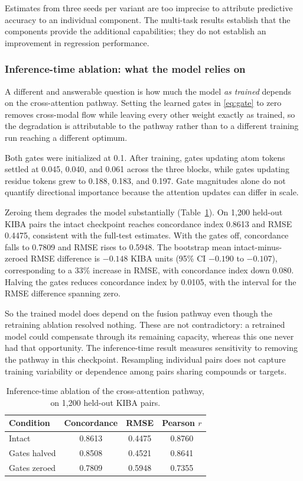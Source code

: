 \documentclass{ieeeaccess}
\begin{document}
Estimates from three seeds per variant are too imprecise to attribute
predictive accuracy to an individual component. The multi-task
results establish that the components provide the additional capabilities;
they do not establish an improvement in regression performance.

\subsubsection{Inference-time ablation: what the model relies on}
A different and answerable question is how much the model \emph{as trained}
depends on the cross-attention pathway. Setting the learned gates in
\eqref{eq:gate} to zero removes cross-modal flow while leaving every other weight
exactly as trained, so the degradation is attributable to the pathway rather
than to a different training run reaching a different optimum.

Both gates were initialized at 0.1. After training, gates updating atom tokens
settled at 0.045, 0.040, and 0.061 across the three blocks, while gates updating
residue tokens grew to 0.188, 0.183, and 0.197. Gate magnitudes alone do not
quantify directional importance because the attention updates can differ in scale.

Zeroing them degrades the model substantially (Table~\ref{tab:ablation_inf}). On
1{,}200 held-out KIBA pairs the intact checkpoint reaches concordance index
0.8613 and RMSE 0.4475, consistent with the full-test estimates. With the gates
off, concordance falls to 0.7809 and RMSE rises to 0.5948. The bootstrap mean intact-minus-zeroed RMSE
difference is $-0.148$ KIBA units (95\% CI $-0.190$ to $-0.107$),
corresponding to a 33\% increase in RMSE, with
concordance index down 0.080. Halving the gates reduces concordance index by
0.0105, with the interval for the RMSE difference spanning zero.

So the trained model does depend on the fusion pathway even though the
retraining ablation resolved nothing. These are not contradictory: a retrained
model could compensate through its remaining capacity, whereas this one never
had that opportunity. The inference-time result measures sensitivity to removing the pathway in this
checkpoint. Resampling individual pairs does not capture training variability
or dependence among pairs sharing compounds or targets.

\begin{table}[!t]
\caption{Inference-time ablation of the cross-attention pathway, on 1{,}200
held-out KIBA pairs.}
\label{tab:ablation_inf}
\centering
\begin{tabular}{lccc}
\toprule
Condition & Concordance & RMSE & Pearson $r$ \\
\midrule
Intact                  & 0.8613 & 0.4475 & 0.8760 \\
Gates halved            & 0.8508 & 0.4521 & 0.8641 \\
Gates zeroed            & 0.7809 & 0.5948 & 0.7355 \\
\bottomrule
\end{tabular}
\end{table}
\end{document}
